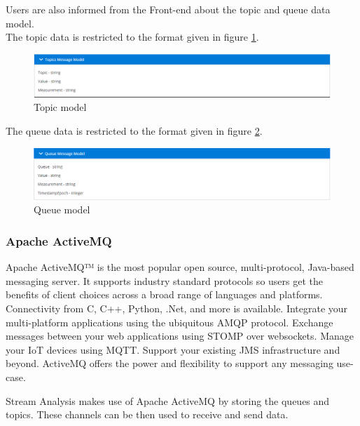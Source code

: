 Users are also informed from the Front-end about the topic and queue data model. \\

The topic data is restricted to the format given in figure \ref{fig:topic}.\\

\begin{figure}[h]
	\centering
	\includegraphics[width=1\linewidth]{./images/webapp/topic.PNG}
	\caption{Topic model}
	\label{fig:topic}
\end{figure}

The queue data is restricted to the format given in figure \ref{fig:queue}.\\

\begin{figure}[h]
	\centering
	\includegraphics[width=1\linewidth]{./images/webapp/queue.PNG}
	\caption{Queue model}
	\label{fig:queue}
\end{figure}

\subsubsection{Apache ActiveMQ}
\label{chap:04:03:04:01}

Apache ActiveMQ™ is the most popular open source, multi-protocol, Java-based messaging server. It supports industry standard protocols so users get the benefits of client choices across a broad range of languages and platforms. Connectivity from C, C++, Python, .Net, and more is available. Integrate your multi-platform applications using the ubiquitous AMQP protocol. Exchange messages between your web applications using STOMP over websockets. Manage your IoT devices using MQTT. Support your existing JMS infrastructure and beyond. ActiveMQ offers the power and flexibility to support any messaging use-case.\cite{apache-active-mq}

Stream Analysis makes use of Apache ActiveMQ by storing the queues and topics. These channels can be then used to receive and send data.

